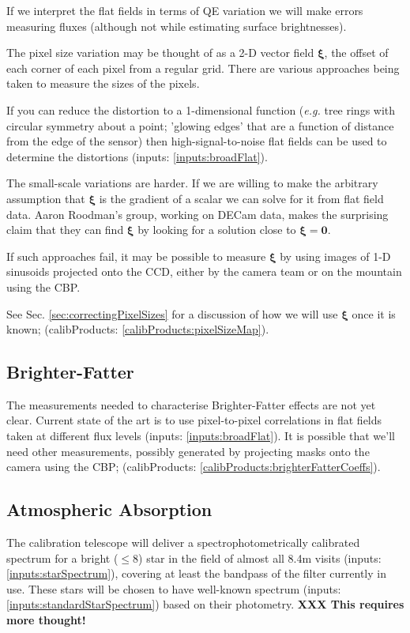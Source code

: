 \documentclass[12pt]{article}
\newcommand{\eg}{\textit{e.g.}\xspace}
\newcommand{\xib}{{\boldsymbol \xi}}
\newcommand{\zerob}{{\boldsymbol 0}}
\newcommand{\inputData}[1]{(inputs: \ref{inputs:#1})}
\newcommand{\outputData}[1]{(calibProducts: \ref{calibProducts:#1})}
\newcommand{\XXX}[1]{\textbf{XXX #1}\xspace}
\newcommand{\secRef}[1]{Sec. \ref{sec:#1}}
\begin{document}
If we interpret the flat fields in terms of QE variation we will make errors measuring fluxes (although
not while estimating surface brightnesses).

The pixel size variation may be thought of as a 2-D vector field $\xib$, the offset of each corner of each
pixel from a regular grid. There are various approaches being taken to measure the sizes of the pixels.

If you can reduce the distortion
to a 1-dimensional function (\eg tree rings with circular symmetry about a point; 'glowing edges' that are
a function of distance from the edge of the sensor) then high-signal-to-noise flat fields can be used to
determine the distortions \inputData{broadFlat}.

The small-scale variations are harder.  If we are willing to make the arbitrary assumption that $\xib$ is the
gradient of a scalar we can solve for it from flat field data.  Aaron Roodman's group, working on DECam data,
makes the surprising claim that they can find $\xib$ by looking for a solution close to $\xib = \zerob$.

If such approaches fail, it may be possible to measure $\xib$ by using images of 1-D sinusoids projected
onto the CCD, either by the camera team or on the mountain using the CBP.

See \secRef{correctingPixelSizes} for a discussion of how we will use $\xib$ once it is known;
\outputData{pixelSizeMap}.

\subsection{Brighter-Fatter}
\label{sec:brighterFatter}

The measurements needed to characterise Brighter-Fatter effects are not yet clear.  Current state of the art
is to use pixel-to-pixel correlations in flat fields taken at different flux levels \inputData{broadFlat}.  It
is possible that we'll need other measurements, possibly generated by projecting masks onto the camera using
the CBP;  \outputData{brighterFatterCoeffs}.

\subsection{Atmospheric Absorption}

The calibration telescope will deliver a spectrophotometrically calibrated spectrum for a bright ($\le 8$)
star in the field of almost all 8.4m visits \inputData{starSpectrum}, covering at least the bandpass of the
filter currently in use.  These stars will be chosen to have well-known spectrum
\inputData{standardStarSpectrum} based on their photometry. \XXX{This requires more thought!}
\end{document}
